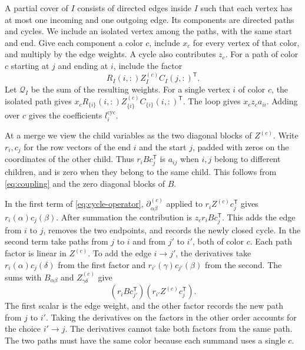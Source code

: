 \documentclass[11pt,reqno]{amsart}
\theoremstyle{remark}
\numberwithin{equation}{section}
\begin{document}
A partial cover of \(I\) consists of directed edges inside \(I\) such
that each vertex has at most one incoming and one outgoing edge. Its
components are directed paths and cycles. We include an isolated vertex
among the paths, with the same start and end. Give each component a color
\(c\), include \(x_c\) for every vertex of that color, and multiply by
the edge weights. A cycle also contributes \(z_c\). For a path of color
\(c\) starting at \(j\) and ending at \(i\), include the factor
\begin{equation}\label{eq:cycle-endpoints}
 R_I(i,:)Z_I^{(c)}C_I(j,:)^{\mathsf T}.
\end{equation}
Let \(\mathcal Q_I\) be the sum of the resulting weights. For a single
vertex \(i\) of color \(c\), the isolated path gives \(x_c
R_{\{i\}}(i,:)Z_{\{i\}}^{(c)} C_{\{i\}}(i,:)^{\mathsf T}\). The loop
gives \(x_cz_ca_{ii}\). Adding over \(c\) gives the coefficients
\(l_i^{\mathrm{cyc}}\).

At a merge we view the child variables as the two diagonal blocks of
\(Z^{(c)}\). Write \(r_i,c_j\) for the row vectors of the end \(i\) and
the start \(j\), padded with zeros on the coordinates of the other child.
Thus \(r_iBc_j^{\mathsf T}\) is \(a_{ij}\) when \(i,j\) belong to
different children, and is zero when they belong to the same child. This
follows from \eqref{eq:coupling} and the zero diagonal blocks of \(B\).

In the first term of \eqref{eq:cycle-operator},
\(\partial_{\alpha\beta}^{(c)}\) applied to \(r_iZ^{(c)}c_j^{\mathsf T}\)
gives \(r_i(\alpha)c_j(\beta)\). After summation the contribution is
\(z_c r_iBc_j^{\mathsf T}\). This adds the edge from \(i\) to \(j\),
removes the two endpoints, and records the newly closed cycle. In the
second term take paths from \(j\) to \(i\) and from \(j'\) to \(i'\),
both of color \(c\). Each path factor is linear in \(Z^{(c)}\). To add
the edge \(i\to j'\), the derivatives take \(r_i(\alpha)c_j(\delta)\)
from the first factor and \(r_{i'}(\gamma)c_{j'}(\beta)\) from the
second. The sums with \(B_{\alpha\beta}\) and \(Z_{\gamma\delta}^{(c)}\)
give
\[
 (r_i Bc_{j'}^{\mathsf T})(r_{i'}Z^{(c)}c_j^{\mathsf T}).
\]
The first scalar is the edge weight, and the other factor records the new
path from \(j\) to \(i'\). Taking the derivatives on the factors in the
other order accounts for the choice \(i'\to j\). The derivatives cannot
take both factors from the same path. The two paths must have the same
color because each summand uses a single \(c\).
\end{document}
